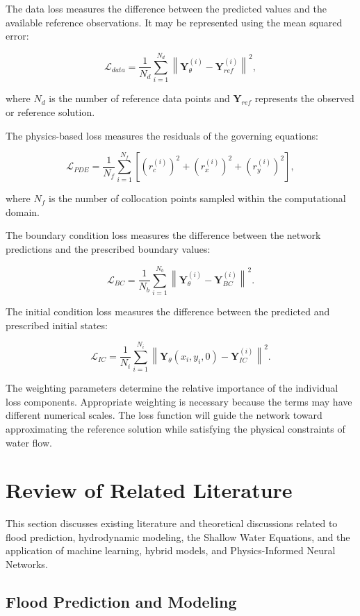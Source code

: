 The data loss measures the difference between the predicted values and the available reference observations. It may be represented using the mean squared error:

\[
\mathcal{L}_{data}
=
\frac{1}{N_d}
\sum_{i=1}^{N_d}
\left\|
\mathbf{Y}_{\theta}^{(i)}
-
\mathbf{Y}_{ref}^{(i)}
\right\|^2,
\]

where $N_d$ is the number of reference data points and $\mathbf{Y}_{ref}$ represents the observed or reference solution.

The physics-based loss measures the residuals of the governing equations:

\[
\mathcal{L}_{PDE}
=
\frac{1}{N_f}
\sum_{i=1}^{N_f}
\left[
(r_c^{(i)})^2
+
(r_x^{(i)})^2
+
(r_y^{(i)})^2
\right],
\]

where $N_f$ is the number of collocation points sampled within the computational domain.

The boundary condition loss measures the difference between the network predictions and the prescribed boundary values:

\[
\mathcal{L}_{BC}
=
\frac{1}{N_b}
\sum_{i=1}^{N_b}
\left\|
\mathbf{Y}_{\theta}^{(i)}
-
\mathbf{Y}_{BC}^{(i)}
\right\|^2.
\]

The initial condition loss measures the difference between the predicted and prescribed initial states:

\[
\mathcal{L}_{IC}
=
\frac{1}{N_i}
\sum_{i=1}^{N_i}
\left\|
\mathbf{Y}_{\theta}(x_i,y_i,0)
-
\mathbf{Y}_{IC}^{(i)}
\right\|^2.
\]

The weighting parameters determine the relative importance of the individual loss components. Appropriate weighting is necessary because the terms may have different numerical scales. The loss function will guide the network toward approximating the reference solution while satisfying the physical constraints of water flow.

\section{Review of Related Literature}

This section discusses existing literature and theoretical discussions related to flood prediction, hydrodynamic modeling, the Shallow Water Equations, and the application of machine learning, hybrid models, and Physics-Informed Neural Networks.

\subsection{Flood Prediction and Modeling}

